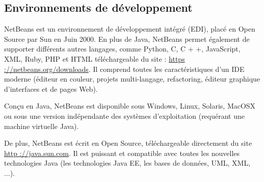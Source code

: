\subsection{Environnements de développement}
\begin{onehalfspace}
NetBeans est un environnement de développement intégré (EDI), placé en Open Source par Sun en Juin 2000. En plus de Java, NetBeans permet également de supporter différents autres langages, comme Python, C, C + +, JavaScript, XML, Ruby, PHP et HTML téléchargeable du site : \url{https ://netbeans.org/downloads}. Il comprend toutes les caractéristiques d’un IDE moderne (éditeur en couleur, projets multi-langage, refactoring, éditeur graphique d’interfaces et de pages Web).\medskip

Conçu en Java, NetBeans est disponible sous Windows, Linux, Solaris, MacOSX ou sous une version indépendante des systèmes d’exploitation (requérant une machine virtuelle Java).\medskip

De plus, NetBeans est écrit en Open Source, téléchargeable directement du site \url{http ://java.sun.com}. Il est puissant et compatible avec toutes les nouvelles technologies Java (les technologies Java EE, les bases de données, UML, XML, ...).
\end{onehalfspace}

